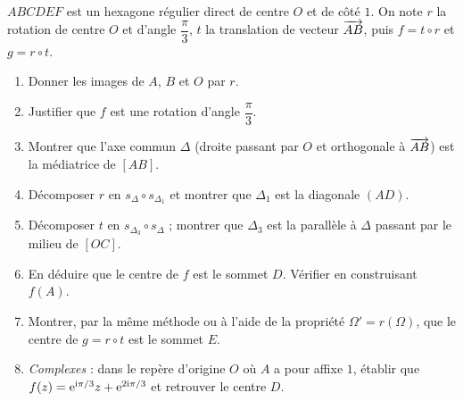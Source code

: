 $ABCDEF$ est un hexagone régulier direct de centre $O$ et de côté $1$. On note
$r$ la rotation de centre $O$ et d'angle $\dfrac{\pi}{3}$, $t$ la translation
de vecteur $\overrightarrow{AB}$, puis $f=t\circ r$ et $g=r\circ t$.

\begin{center}
\end{center}

\begin{enumerate}
	\item Donner les images de $A$, $B$ et $O$ par $r$.
	\item Justifier que $f$ est une rotation d'angle $\dfrac{\pi}{3}$.
	\item Montrer que l'axe commun $\Delta$ (droite passant par $O$ et
	orthogonale à $\overrightarrow{AB}$) est la médiatrice de $[AB]$.
	\item Décomposer $r$ en $s_{\Delta}\circ s_{\Delta_1}$ et montrer que
	$\Delta_1$ est la diagonale $(AD)$.
	\item Décomposer $t$ en $s_{\Delta_3}\circ s_{\Delta}$ ; montrer que
	$\Delta_3$ est la parallèle à $\Delta$ passant par le milieu de $[OC]$.
	\item En déduire que le centre de $f$ est le sommet $D$. Vérifier en
	construisant $f(A)$.
	\item Montrer, par la même méthode ou à l'aide de la propriété
	$\Omega'=r(\Omega)$, que le centre de $g=r\circ t$ est le sommet $E$.
	\item \emph{Complexes} : dans le repère d'origine $O$ où $A$ a pour affixe
	$1$, établir que $f(z)=\mathrm{e}^{\mathrm{i}\pi/3}z+\mathrm{e}^{2\mathrm{i}\pi/3}$ et retrouver le
	centre $D$.
\end{enumerate}

